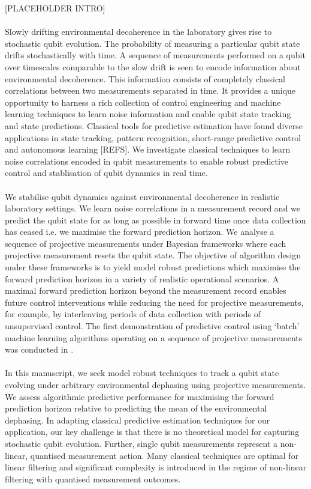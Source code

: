 [PLACEHOLDER INTRO]
\\
\\
Slowly drifting environmental decoherence in the laboratory gives rise to stochastic qubit evolution. The probability of measuring a particular qubit state drifts stochastically with time. A sequence of measurements performed on a qubit over timescales comparable to the slow drift is seen to encode information about environmental decoherence. This information consists of completely classical correlations between two measurements separated in time.  It provides a unique opportunity to harness a rich collection of control engineering and machine learning techniques to learn noise information and enable qubit state tracking and state predictions. Classical tools for predictive estimation have found diverse applications in state tracking, pattern recognition, short-range predictive control and autonomous learning [REFS]. We investigate classical techniques to learn noise correlations encoded in qubit measurements to enable robust predictive control and stablisation of qubit dynamics in real time. 
\\
\\
We stabilise qubit dynamics against environmental decoherence in realistic laboratory settings. We learn noise correlations in a measurement record and we predict the qubit state for as long as possible in forward time once data collection has ceased i.e. we maximise the forward prediction horizon.  We analyse a sequence of projective measurements under Bayesian frameworks where each projective measurement resets the qubit state. The objective of algorithm design under these frameworks is to yield model robust predictions which maximise the forward prediction horizon in a variety of realistic operational scenarios. A maximal forward prediction horizon beyond the measurement record enables future control interventions while reducing the need for projective measurements, for example, by interleaving periods of data collection with periods of unsupervised control. The first demonstration of predictive control using `batch' machine learning algorithms operating on a sequence of projective measurements was conducted in \cite{mavadia2017}.
\\
\\
In this manuscript, we seek model robust techniques to track a qubit state evolving under arbitrary environmental dephasing using projective measurements. We assess algorithmic predictive performance for maximising the forward prediction horizon relative to predicting the mean of the environmental dephasing. In adapting classical predictive estimation techniques for our application, our key challenge is that there is no theoretical model for capturing stochastic qubit evolution. Further, single qubit measurements represent a non-linear, quantised measurement action.  Many classical techniques are optimal for linear filtering and significant complexity is introduced in the regime of non-linear filtering with quantised measurement outcomes. 
